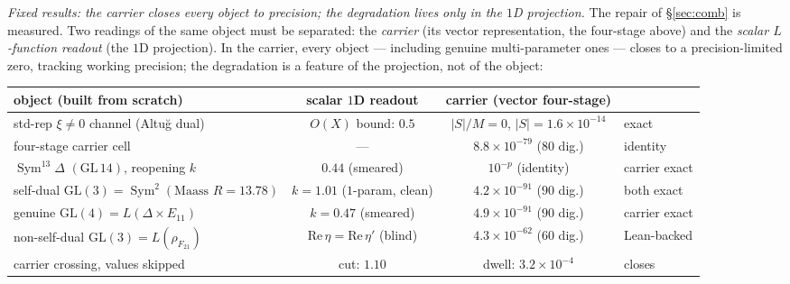 \documentclass[11pt]{article}
\theoremstyle{definition}
\newcommand{\Sym}{\operatorname{Sym}}
\begin{document}
\emph{Fixed results: the carrier closes every object to precision; the degradation lives only in the $1$D
projection.} The repair of \S\ref{sec:comb} is measured. Two readings of the same object must be separated: the
\emph{carrier} (its vector representation, the four-stage above) and the \emph{scalar $L$-function readout} (the
$1$D projection). In the carrier, every object --- including genuine multi-parameter ones --- closes to a
precision-limited zero, tracking working precision; the degradation is a feature of the projection, not of the
object:

\begin{center}
\footnotesize
\setlength{\tabcolsep}{3.5pt}%
\begin{tabular}{lccl}
\toprule
object (built from scratch) & scalar $1$D readout & carrier (vector four-stage) & \\
\midrule
std-rep $\xi\neq0$ channel (Altu\u{g} dual) & $O(X)$ bound: $0.5$ & $|S|/M=0$, $|S|=1.6{\times}10^{-14}$ & exact \\
four-stage carrier cell & --- & $8.8{\times}10^{-79}$ ($80$ dig.) & identity \\
$\Sym^{13}\Delta$ $(\mathrm{GL}\,14)$, reopening $k$ & $0.44$ (smeared) & $10^{-p}$ (identity) & carrier exact \\
self-dual $\mathrm{GL}(3)=\Sym^2(\text{Maass }R{=}13.78)$ & $k=1.01$ ($1$-param, clean) & $4.2{\times}10^{-91}$ ($90$ dig.) & both exact \\
genuine $\mathrm{GL}(4)=L(\Delta\times E_{11})$ & $k=0.47$ (smeared) & $4.9{\times}10^{-91}$ ($90$ dig.) & carrier exact \\
non-self-dual $\mathrm{GL}(3)=L(\rho_{F_{21}})$ & $\mathrm{Re}\,\eta{=}\mathrm{Re}\,\eta'$ (blind) & $4.3{\times}10^{-62}$ ($60$ dig.) & Lean-backed \\
carrier crossing, values skipped & cut: $1.10$ & dwell: $3.2{\times}10^{-4}$ & closes \\
\bottomrule
\end{tabular}
\end{center}
\end{document}
